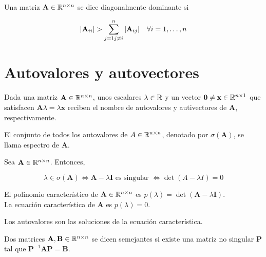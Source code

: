 \begin{defi}
Una matriz $\mathbf{A} \in \mathbb{R}^{n \times n}$ se dice diagonalmente dominante si 

\[ |\mathbf{A}_{ii}| > \sum_{j=1 \\ j \neq i}^{n} |\mathbf{A}_{ij}| \quad \forall i = 1,\dots, n \]
\end{defi}



\section{Autovalores y autovectores}
\begin{defi}
Dada una matriz $\mathbf{A} \in \mathbb{R}^{n \times n}$, unos escalares $\lambda \in \mathbb{R}$ y un vector $\mathbf{0} \neq \mathbf{x} \in \mathbb{R}^{n \times 1}$ que satisfacen $\mathbf{A} \lambda = \lambda \mathbf{x}$ reciben el nombre de autovalores y autivectores de $\mathbf{A}$, respectivamente.
\end{defi}

\begin{defi}
El conjunto de todos los autovalores de $A \in \mathbb{R}^{n \times n}$, denotado por $\sigma(\mathbf{A})$, se llama espectro de $\mathbf{A}$.
\end{defi}

\begin{prop}
Sea $\mathbf{A} \in \mathbb{R}^{n \times n}$. Entonces,

\[ \lambda \in \sigma(\mathbf{A}) \iff \mathbf{A} - \lambda \mathbf{I} \text{ es singular } \iff \det(A - \lambda I) = 0 \] 
\end{prop}

\begin{defi}
El polinomio característico de $\mathbf{A} \in \mathbb{R}^{n \times n}$ es $p(\lambda) = \det(\mathbf{A} - \lambda \mathbf{I})$.\\

La ecuación característica de $\mathbf{A}$ es $p(\lambda) = 0$.
\end{defi}

\begin{defi}
Los autovalores son las soluciones de la ecuación característica.
\end{defi}

\begin{defi}
Dos matrices $\mathbf{A}, \mathbf{B} \in \mathbb{R}^{n \times n}$ se dicen semejantes si existe una matriz no singular $\mathbf{P}$ tal que $\mathbf{P}^{-1}\mathbf{A} \mathbf{P} = \mathbf{B}$.
\end{defi}

